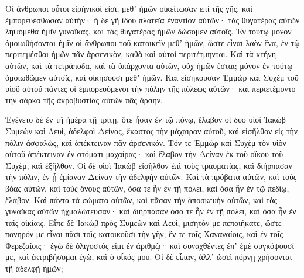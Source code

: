 {Οἱ ἄνθρωποι οὗτοι εἰρήνικοί εἰσι, μεθʼ ἡμῶν οἰκείτωσαν επὶ τῆς γῆς, καὶ ἐμπορευέσθωσαν αὐτήν· ἡ δὲ γῆ ἰδοὺ πλατεῖα ἐναντίον αὐτῶν· τὰς θυγατέρας αὐτῶν ληψόμεθα ἡμῖν γυναῖκας, καὶ τὰς θυγατέρας ἡμῶν δώσομεν αὐτοῖς.
Ἐν τούτῳ μόνον ὁμοιωθήσονται ἡμῖν οἱ ἄνθρωποι τοῦ κατοικεῖν μεθʼ ἡμῶν, ὥστε εἶναι λαὸν ἕνα, ἐν τῷ περιτεμέσθαι ἡμῶν πᾶν ἀρσενικὸν, καθὰ καὶ αὐτοὶ περιτέτμηνται.
Καὶ τὰ κτήνη αὐτῶν, καὶ τὰ τετράποδα, καὶ τὰ ὑπάρχοντα αὐτῶν, οὐχ ἡμῶν ἔσται; μόνον ἐν τούτῳ ὁμοιωθῶμεν αὐτοῖς, καὶ οἰκήσουσι μεθʼ ἡμῶν.
Καὶ εἰσήκουσαν Ἐμμὼρ καὶ Συχὲμ τοῦ υἱοῦ αὐτοῦ πάντες οἱ ἐμπορευόμενοι τὴν πύλην τῆς πόλεως αὐτῶν· καὶ περιετέμοντο τὴν σάρκα τῆς ἀκροβυστίας αὐτῶν πᾶς ἄρσην.
\par }{\PP {}Ἐγένετο δὲ ἐν τῇ ἡμέρᾳ τῇ τρίτῃ, ὅτε ἦσαν ἐν τῷ πόνῳ, ἔλαβον οἱ δύο υἱοὶ Ἰακὼβ Συμεὼν καὶ Λευὶ, ἀδελφοὶ Δείνας, ἕκαστος τὴν μάχαιραν αὐτοῦ, καὶ εἰσῆλθον εἰς τὴν πόλιν ἀσφαλὼς, καὶ ἀπέκτειναν πᾶν ἀρσενικόν.
Τόν τε Ἐμμὼρ καὶ Συχὲμ τὸν υἱὸν αὐτοῦ ἀπέκτειναν ἐν στόματι μαχαίρας· καὶ ἔλαβον τὴν Δείναν ἐκ τοῦ οἴκου τοῦ Συχὲμ, καὶ ἐξῆλθον.
Οἱ δὲ υἱοὶ Ἰακὼβ εἰσῆλθον ἐπὶ τοὺς τραυματίας, καὶ διήρπασαν τὴν πόλιν, ἐν ᾗ ἐμίαναν Δείναν τὴν ἀδελφὴν αὐτῶν.
Καὶ τὰ πρόβατα αὐτῶν, καὶ τοὺς βόας αὐτῶν, καὶ τοὺς ὄνους αὐτῶν, ὅσα τε ἦν ἐν τῇ πόλει, καὶ ὅσα ἦν ἐν τῷ πεδίῳ, ἔλαβον.
Καὶ πάντα τὰ σώματα αὐτῶν, καὶ πᾶσαν τὴν ἀποσκευὴν αὐτῶν, καὶ τὰς γυναῖκας αὐτῶν ἠχμαλώτευσαν· καὶ διήρπασαν ὅσα τε ἦν ἐν τῇ πόλει, καὶ ὅσα ἦν ἐν ταῖς οἰκίαις.
Εἶπε δὲ Ἰακὼβ πρὸς Συμεὼν καὶ Λευὶ, μισητόν με πεποιήκατε, ὥστε πονηρόν με εἶναι πᾶσι τοῖς κατοικοῦσι τὴν γῆν, ἔν τε τοῖς Χαναναίοις, καὶ ἐν τοῖς Φερεζαίοις· ἐγὼ δὲ ὀλιγοστός εἰμι ἐν ἀριθμῷ· καὶ συναχθέντες ἐπʼ ἐμὲ συγκόψουσί με, καὶ ἐκτριβήσομαι ἐγὼ, καὶ ὁ οἶκός μου.
Οἱ δὲ εἶπαν, ἀλλʼ ὡσεὶ πόρνῃ χρήσονται τῇ ἀδελφῇ ἡμῶν;

}
